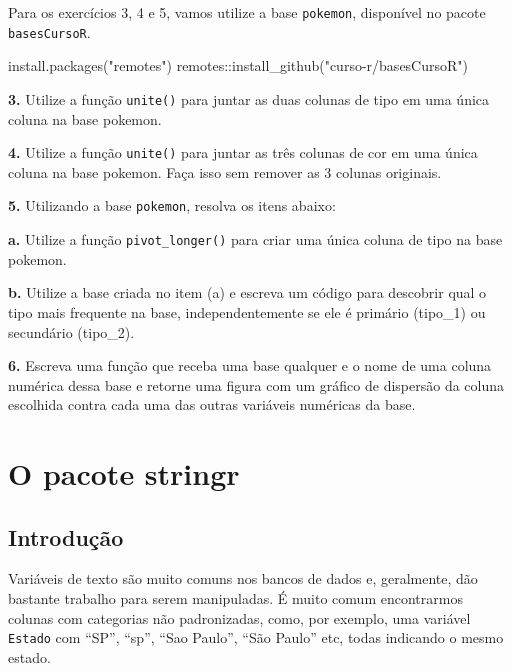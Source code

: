 \documentclass[
]{book}
\newenvironment{Shaded}{\begin{snugshade}}{\end{snugshade}}
\newcommand{\FunctionTok}[1]{\textcolor[rgb]{0.00,0.00,0.00}{#1}}
\newcommand{\NormalTok}[1]{#1}
\newcommand{\SpecialCharTok}[1]{\textcolor[rgb]{0.00,0.00,0.00}{#1}}
\newcommand{\StringTok}[1]{\textcolor[rgb]{0.31,0.60,0.02}{#1}}
\begin{document}
Para os exercícios 3, 4 e 5, vamos utilize a base \texttt{pokemon}, disponível no pacote \texttt{basesCursoR}.

\begin{Shaded}
\begin{Highlighting}[]
\FunctionTok{install.packages}\NormalTok{(}\StringTok{"remotes"}\NormalTok{)}
\NormalTok{remotes}\SpecialCharTok{::}\FunctionTok{install\_github}\NormalTok{(}\StringTok{"curso{-}r/basesCursoR"}\NormalTok{)}
\end{Highlighting}
\end{Shaded}

\textbf{3.} Utilize a função \texttt{unite()} para juntar as duas colunas de tipo em uma única coluna na base pokemon.

\textbf{4.} Utilize a função \texttt{unite()} para juntar as três colunas de cor em uma única coluna na base pokemon. Faça isso sem remover as 3 colunas originais.

\textbf{5.} Utilizando a base \texttt{pokemon}, resolva os itens abaixo:

\textbf{a.} Utilize a função \texttt{pivot\_longer()} para criar uma única coluna de tipo na base pokemon.

\textbf{b.} Utilize a base criada no item (a) e escreva um código para descobrir qual o tipo mais frequente na base, independentemente se ele é primário (tipo\_1) ou secundário (tipo\_2).

\textbf{6.} Escreva uma função que receba uma base qualquer e o nome de uma coluna numérica dessa base e retorne uma figura com um gráfico de dispersão da coluna escolhida contra cada uma das outras variáveis numéricas da base.

\hypertarget{o-pacote-stringr}{%
\section{O pacote stringr}\label{o-pacote-stringr}}

\hypertarget{introduuxe7uxe3o}{%
\subsection{Introdução}\label{introduuxe7uxe3o}}

Variáveis de texto são muito comuns nos bancos de dados e, geralmente, dão bastante trabalho para serem manipuladas. É muito comum encontrarmos colunas com categorias não padronizadas, como, por exemplo, uma variável \texttt{Estado} com ``SP'', ``sp'', ``Sao Paulo'', ``São Paulo'' etc, todas indicando o mesmo estado.
\end{document}

